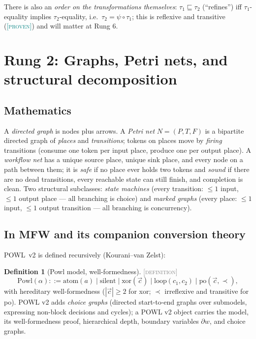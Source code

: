 \documentclass[11pt]{article}
\newcommand{\PROVEN}{\textcolor{teal}{\textsc{[proven]}}}
\newcommand{\DEFINITION}{\textcolor{gray}{\textsc{[definition]}}}
\theoremstyle{plain}
\theoremstyle{definition}
\newtheorem{definition}[theorem]{Definition}
\theoremstyle{remark}
\begin{document}
There is also an \emph{order on the transformations themselves}:
$\tau_1 \sqsubseteq \tau_2$ (``refines'') iff $\tau_1$-equality implies
$\tau_2$-equality, i.e.\ $\tau_2 = \psi \circ \tau_1$; this is reflexive
and transitive (\PROVEN) and will matter at Rung 6.

\section{Rung 2: Graphs, Petri nets, and structural decomposition}
\label{sec:rung2}

\subsection{Mathematics}
A \emph{directed graph} is nodes plus arrows. A \emph{Petri net}
$N = (P, T, F)$ is a bipartite directed graph of \emph{places} and
\emph{transitions}; tokens on places move by \emph{firing} transitions
(consume one token per input place, produce one per output place).
A \emph{workflow net} has a unique source place, unique sink place, and
every node on a path between them; it is \emph{safe} if no place ever
holds two tokens and \emph{sound} if there are no dead transitions, every
reachable state can still finish, and completion is clean. Two structural
subclasses: \emph{state machines} (every transition: $\le 1$ input,
$\le 1$ output place --- all branching is choice) and \emph{marked graphs}
(every place: $\le 1$ input, $\le 1$ output transition --- all branching is
concurrency).

\subsection{In MFW and its companion conversion theory}
POWL~v2 is defined recursively (Kourani--van Zelst):
\begin{definition}[Powl model, well-formedness]\DEFINITION\;
\[
  \mathrm{Powl}(\alpha) ::= \mathrm{atom}(a) \mid \mathrm{silent} \mid
  \mathrm{xor}(\vec{c}) \mid \mathrm{loop}(c_1, c_2) \mid
  \mathrm{po}(\vec{c}, \prec),
\]
with hereditary well-formedness ($|\vec{c}| \ge 2$ for xor; $\prec$
irreflexive and transitive for po). POWL v2 adds \emph{choice graphs}
(directed start-to-end graphs over submodels, expressing non-block
decisions and cycles); a POWL v2 object carries the model, its
well-formedness proof, hierarchical depth, boundary variables
$\partial w$, and choice graphs.
\end{definition}
\end{document}
